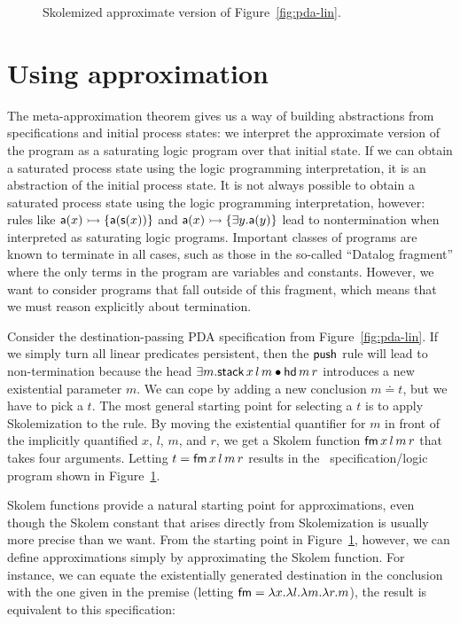 \begin{figure}
\caption{Skolemized approximate version of Figure~\ref{fig:pda-lin}.}
\label{fig:pda-pers}
\end{figure}



\section{Using approximation}

The meta-approximation theorem gives us a way of building abstractions
from specifications and initial process states: we interpret the
approximate version of the program as a saturating logic program over
that initial state. If we can obtain a saturated process state using
the logic programming interpretation, it is an abstraction of the
initial process state. It is not always possible to obtain a saturated
process state using the logic programming interpretation, however:
rules like ${\sf a}(x) \rightarrowtail \{ {\sf a}({\sf s}(x)) \}$ and ${\sf
  a}(x) \rightarrowtail \{ \exists y. {\sf a}(y) \}$ lead to nontermination
when interpreted as saturating logic programs. Important classes 
of programs are known to terminate in all cases, such as those in the
so-called ``Datalog fragment'' where the only terms in the program
are variables and constants. However, we want to consider programs
that fall outside of this fragment, which means that we must 
reason explicitly about termination.

Consider the destination-passing PDA specification from
Figure~\ref{fig:pda-lin}. If we simply turn all linear predicates
persistent, then the ${\sf push}$ rule will lead to non-termination
because the head $\exists m. {\sf stack}\,x\,l\,m \mathbin{\bullet} {\sf
  hd}\,m\,r$ introduces a new existential parameter $m$. We can cope
by adding a new conclusion $m \doteq t$, but we have to pick a $t$.
The most general starting point for selecting a $t$ is to apply
Skolemization to the rule. By moving the existential quantifier for
$m$ in front of the implicitly quantified $x$, $l$, $m$, and $r$, we
get a Skolem function ${\sf fm}\,x\,l\,m\,r$ that takes four
arguments. Letting $t = {\sf fm}\,x\,l\,m\,r$ results in the
\sls~specification/logic program shown in
Figure~\ref{fig:pda-pers}.

Skolem functions provide a natural starting point for approximations,
even though the Skolem constant that arises directly from
Skolemization is usually more precise than we want. From the starting
point in Figure~\ref{fig:pda-pers}, however, we can define
approximations simply by approximating the Skolem function.  For
instance, we can equate the existentially generated destination in the
conclusion with the one given in the premise (letting ${\sf fm} =
\lambda x. \lambda l. \lambda m. \lambda r. m$), the result is
equivalent to this specification:

